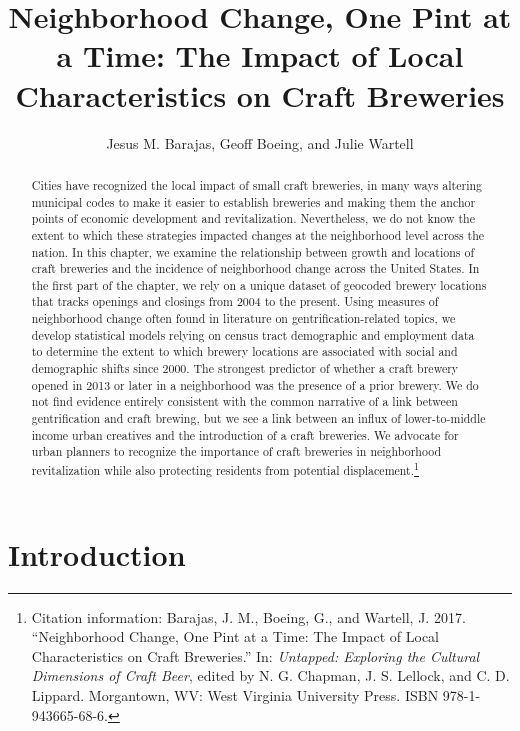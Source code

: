 \documentclass[]{article}
\title{Neighborhood Change, One Pint at a Time: The Impact of Local Characteristics on Craft Breweries}
\author{Jesus M. Barajas, Geoff Boeing, and Julie Wartell}
\date{}
\begin{document}
\maketitle

\begin{abstract}
Cities have recognized the local impact of small craft breweries, in many ways altering municipal codes to make it easier to establish breweries and making them the anchor points of economic development and revitalization. Nevertheless, we do not know the extent to which these strategies impacted changes at the neighborhood level across the nation. In this chapter, we examine the relationship between growth and locations of craft breweries and the incidence of neighborhood change across the United States. In the first part of the chapter, we rely on a unique dataset of geocoded brewery locations that tracks openings and closings from 2004 to the present. Using measures of neighborhood change often found in literature on gentrification-related topics, we develop statistical models relying on census tract demographic and employment data to determine the extent to which brewery locations are associated with social and demographic shifts since 2000. The strongest predictor of whether a craft brewery opened in 2013 or later in a neighborhood was the presence of a prior brewery. We do not find evidence entirely consistent with the common narrative of a link between gentrification and craft brewing, but we see a link between an influx of lower-to-middle income urban creatives and the introduction of a craft breweries. We advocate for urban planners to recognize the importance of craft breweries in neighborhood revitalization while also protecting residents from potential displacement.\footnote{Citation information: Barajas, J. M., Boeing, G., and Wartell, J. 2017. ``Neighborhood Change, One Pint at a Time: The Impact of Local Characteristics on Craft Breweries.'' In: \emph{Untapped: Exploring the Cultural Dimensions of Craft Beer}, edited by N. G. Chapman, J. S. Lellock, and C. D. Lippard. Morgantown, WV: West Virginia University Press. ISBN 978-1-943665-68-6.}
\end{abstract}

\section{Introduction}\label{introduction}
\end{document}
